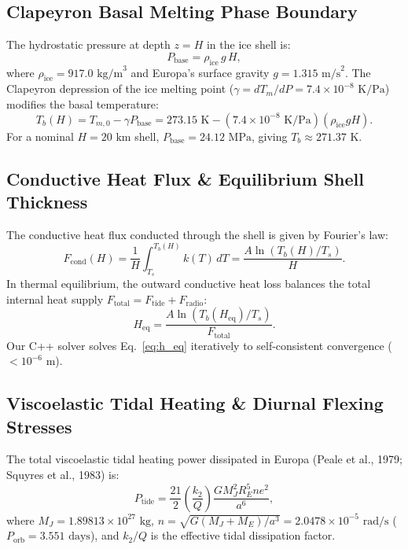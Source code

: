 \documentclass[11pt,a4paper]{article}
\begin{document}
\subsection{Clapeyron Basal Melting Phase Boundary}
The hydrostatic pressure at depth $z = H$ in the ice shell is:
\begin{equation}
P_{\text{base}} = \rho_{\text{ice}} \, g \, H,
\end{equation}
where $\rho_{\text{ice}} = 917.0\text{ kg/m}^3$ and Europa's surface gravity $g = 1.315\text{ m/s}^2$. The Clapeyron depression of the ice melting point ($\gamma = dT_m/dP = 7.4 \times 10^{-8}\text{ K/Pa}$) modifies the basal temperature:
\begin{equation}
T_b(H) = T_{m,0} - \gamma P_{\text{base}} = 273.15\text{ K} - (7.4 \times 10^{-8}\text{ K/Pa}) (\rho_{\text{ice}} g H).
\label{eq:clapeyron}
\end{equation}
For a nominal $H = 20\text{ km}$ shell, $P_{\text{base}} = 24.12\text{ MPa}$, giving $T_b \approx 271.37\text{ K}$.

\subsection{Conductive Heat Flux \& Equilibrium Shell Thickness}
The conductive heat flux conducted through the shell is given by Fourier's law:
\begin{equation}
F_{\text{cond}}(H) = \frac{1}{H} \int_{T_s}^{T_b(H)} k(T) \, dT = \frac{A \ln\left( T_b(H) / T_s \right)}{H}.
\label{eq:flux_cond}
\end{equation}
In thermal equilibrium, the outward conductive heat loss balances the total internal heat supply $F_{\text{total}} = F_{\text{tide}} + F_{\text{radio}}$:
\begin{equation}
H_{\text{eq}} = \frac{A \ln\left( T_b(H_{\text{eq}}) / T_s \right)}{F_{\text{total}}}.
\label{eq:h_eq}
\end{equation}
Our C++ solver solves Eq.~\eqref{eq:h_eq} iteratively to self-consistent convergence ($< 10^{-6}\text{ m}$).

\subsection{Viscoelastic Tidal Heating \& Diurnal Flexing Stresses}
The total viscoelastic tidal heating power dissipated in Europa (Peale et al., 1979; Squyres et al., 1983) is:
\begin{equation}
P_{\text{tide}} = \frac{21}{2} \left(\frac{k_2}{Q}\right) \frac{G M_J^2 R_E^5 n e^2}{a^6},
\label{eq:ptide}
\end{equation}
where $M_J = 1.89813 \times 10^{27}\text{ kg}$, $n = \sqrt{G(M_J + M_E)/a^3} = 2.0478 \times 10^{-5}\text{ rad/s}$ ($P_{\text{orb}} = 3.551\text{ days}$), and $k_2/Q$ is the effective tidal dissipation factor.
\end{document}

